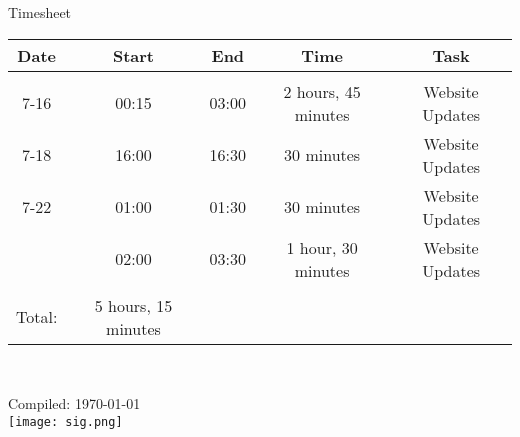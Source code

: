 \documentclass{article}
\begin{document}
\centering
{\huge Timesheet}
\vspace{10 mm}

\begin{table}[ht]
\centering
\begin{tabular}{c c c c c}
Date & Start & End & Time & Task \\ [0.5ex] 
\hline \\
7-16 & 00:15 & 03:00 & 2 hours, 45 minutes & Website Updates \\ [1ex]
7-18 & 16:00 & 16:30 & 30 minutes & Website Updates \\ [1ex]
7-22 & 01:00 & 01:30 & 30 minutes & Website Updates \\ [1ex]
& 02:00 & 03:30 & 1 hour, 30 minutes & Website Updates \\ [1ex]
\hline \\
Total: & 5 hours, 15 minutes \\[10ex]
\end{tabular}\
\end{table}

Compiled: \today \\
\texttt{[image: sig.png]}
\end{document}
